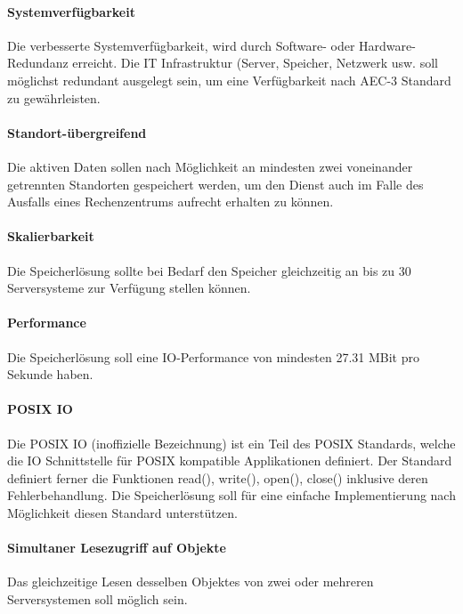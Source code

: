 \paragraph{Systemverfügbarkeit}\label{Soll-2-2}
Die verbesserte Systemverfügbarkeit, wird durch Software- oder Hardware-Redundanz erreicht. Die IT Infrastruktur (Server, Speicher, Netzwerk usw. soll möglichst redundant ausgelegt sein, um eine Verfügbarkeit nach AEC-3 Standard zu gewährleisten.

\paragraph{Standort-übergreifend}\label{Soll-2-3}
Die aktiven Daten sollen nach Möglichkeit an mindesten zwei voneinander getrennten Standorten gespeichert werden, um den Dienst auch im Falle des Ausfalls eines Rechenzentrums aufrecht erhalten zu können.

\setcounter{paragraph}{0}
\renewcommand\theparagraph{Soll-3-\arabic{paragraph}}

\paragraph{Skalierbarkeit}\label{Soll-3-1}
Die Speicherlösung sollte bei Bedarf den Speicher gleichzeitig an bis zu 30 Serversysteme zur Verfügung stellen können.

\paragraph{Performance}\label{Soll-3-2}
Die Speicherlösung soll eine IO-Performance von mindesten 27.31 MBit pro Sekunde haben.

\paragraph{POSIX IO}\label{Soll-3-3}
Die POSIX IO (inoffizielle Bezeichnung) ist ein Teil des POSIX Standards, welche die IO Schnittstelle für POSIX kompatible Applikationen definiert. Der Standard definiert ferner die Funktionen read(), write(), open(), close() inklusive deren Fehlerbehandlung. Die Speicherlösung soll für eine einfache Implementierung nach Möglichkeit diesen Standard unterstützen. 

\paragraph{Simultaner Lesezugriff auf Objekte}\label{Soll-3-4}
Das gleichzeitige Lesen desselben Objektes von zwei oder mehreren Serversystemen soll möglich sein.

